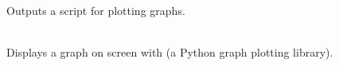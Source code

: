 \documentclass[a4paper, draft]{article}
\begin{document}
\begin{description}
\begin{description}
                \item[] \hfill\\
                    Outputs a  script for plotting graphs.
                    
                \item[] \hfill\\
                    Displays a graph on screen with  
                    (a Python graph plotting library).
                    
        \end{description}
        
        
\end{description}
\end{document}
